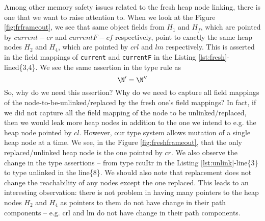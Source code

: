 Among other memory safety issues related to the fresh heap node linking, there is one that we want to raise attention to. When we look at the Figure \ref{fig:frframeout}, we see that same object fields from $H_1$ and $H_f$, which are pointed by $current-cr$ and $currentF-cf$ respectively, point to exactly the same heap nodes $H_2$ and $H_4$, which are pointed by $crl$ and $lm$ respectively. This is asserted in the field mappings of \texttt{current} and \texttt{currentF} in the Listing \ref{lst:fresh}-lined\{3,4\}. We see the same assertion in the type rule as
\[\N' = \N''\]
So, why do we need this assertion? Why do we need to capture all field mappings of the node-to-be-unlinked/replaced by the fresh one's field mappings? In fact, if we did not capture all the field mapping of the node to be unlinked/replaced, then we would leak more heap nodes in addition to the one we intend to e.g. the heap node pointed by $cl$. However, our type system allows mutation of a single heap node at a time. We see, in the Figure \ref{fig:freshframeout}, that the only replaced/unlinked heap node is the one pointed by $cr$. We also observe the change in the type assertions -- from type \textsf{rcuItr} in the Listing \ref{lst:unlink}-line\{3\} to type \textsf{unlinked} in the line\{8\}. We should also note that replacement does not change the reachability of any nodes except the one replaced. This leads to an interesting observation: there is not problem in having many pointers to the heap nodes $H_2$ and $H_4$ as pointers to them do not have change in their path components -- e.g. crl and lm do not have change in their path components. 
